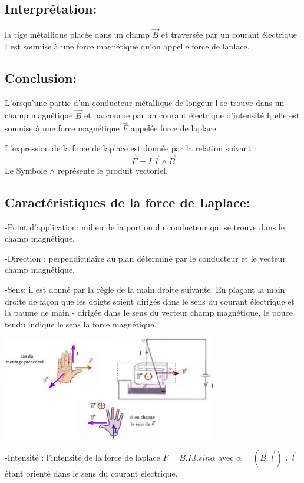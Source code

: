 \documentclass[12pt]{article}
\begin{document}
  \subsection{Interprétation: }
  la tige métallique placée dans un champ $\vec{B}$ et traversée par un courant électrique I est soumise à une force magnétique qu'on appelle force de laplace.
  \subsection{Conclusion:}
  L'orsqu'une partie d'un conducteur métallique de longeur l se trouve dans un champ magnétique $\vec{B}$ et parcourue par un courant électrique d'intensité I, elle est soumise à une force magnétique $\vec{F}$ appelée force de laplace.

  L'expression de la force de laplace est donnée par la relation suivant : $$\vec{F} = I.\vec{l}\wedge \vec{B}$$  
  Le Symbole $\wedge $ représente le produit vectoriel.

  \subsection{Caractéristiques de la force de Laplace:}


-Point d'application: milieu de la portion du conducteur qui se trouve dans le champ magnétique.

-Direction : perpendiculaire au plan déterminé par le conducteur et le vecteur champ magnétique.

  -Sens: il est donné par la règle de la main droite suivante:
En plaçant la main droite de façon que les doigts soient dirigés dans le sens du courant électrique et la paume de main -
dirigée dans le sens du vecteur champ magnétique, le pouce tendu indique le sens la force magnétique.
  \begin{center}

    \includegraphics[width=0.7\textwidth]{./img/la force de Laplace_magn.png}
  \end{center}

  -Intensité : l'intensité de la force de laplace $F=B.I.l.sin\alpha$ avec $\alpha = (\vec{B}, \vec{l})$ . $\vec{l}$ étant orienté dans le sens du courant électrique.
\end{document}
